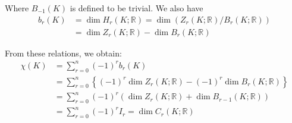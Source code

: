 \documentclass[]{ctexart}
\begin{document}
		Where $B_{-1}(K)$ is defined to be trivial. We also have
			\begin{equation*}
			\begin{aligned}
				b_{r}(K) &=\operatorname{dim} H_{r}(K ; \mathbb{R})=\operatorname{dim}\left(Z_{r}(K ; \mathbb{R}) / B_{r}(K ; \mathbb{R})\right) \\
				&=\operatorname{dim} Z_{r}(K ; \mathbb{R})-\operatorname{dim} B_{r}(K ; \mathbb{R})
			\end{aligned}
			\end{equation*}
			
		From these relations, we obtain:
			\begin{equation*}
			\begin{aligned}
				\chi(K) &=\sum_{r=0}^{n}(-1)^{r} b_{r}(K)\\
				&=\sum_{r=0}^{n}\left\{(-1)^{r} \operatorname{dim} Z_{r}(K ; \mathbb{R})-(-1)^{r} \operatorname{dim} B_{r}(K ; \mathbb{R})\right\} \\
				&=\sum_{r=0}^{n}(-1)^{r}\left(\operatorname{dim} Z_{r}(K ; \mathbb{R})+\operatorname{dim} B_{r-1}(K ; \mathbb{R})\right) \\
				&=\sum_{r=0}^{n}(-1)^{r} I_{r}=\operatorname{dim} C_{r}(K ; \mathbb{R})\\
			\end{aligned}
			\end{equation*}
			
\end{document}
